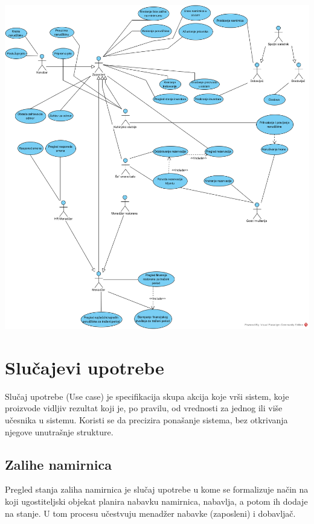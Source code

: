\documentclass{article}
\begin{document}
\includegraphics[width=\textwidth]{SU_0_grupni.png}


\section{Slučajevi upotrebe}


Slučaj upotrebe (Use case) je specifikacija skupa akcija koje vrši sistem, koje proizvode vidljiv rezultat koji je, po pravilu, od vrednosti za jednog ili više učesnika u sistemu. Koristi se da precizira ponašanje sistema, bez otkrivanja njegove unutrašnje strukture.



\subsection{Zalihe namirnica}
Pregled stanja zaliha namirnica je slučaj upotrebe u kome se formalizuje način na koji ugostiteljski objekat planira nabavku namirnica, nabavlja, a potom ih dodaje na stanje. U tom procesu učestvuju menadžer nabavke (zaposleni) i dobavljač. 
\end{document}
